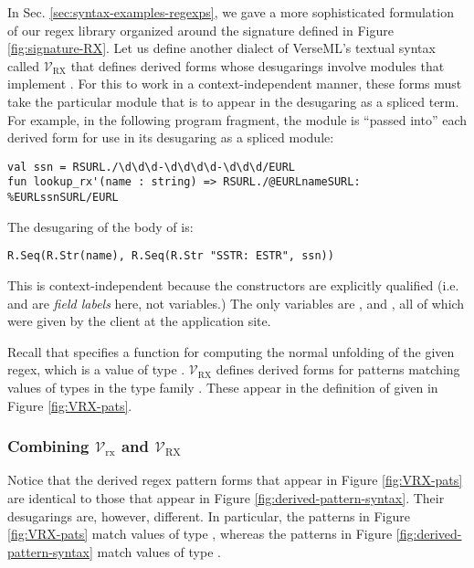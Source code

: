 {In Sec. \ref{sec:syntax-examples-regexps}, we gave a more sophisticated formulation of our regex library organized around the signature  defined in Figure \ref{fig:signature-RX}. Let us define another dialect of VerseML's textual syntax called $\mathcal{V}_\text{RX}$ that defines derived forms whose desugarings involve modules that implement . For this to work in a  context-independent manner, these forms must take the particular module that is to appear in the desugaring as a spliced term. For example, in the following program fragment, the module  is ``passed into'' each derived form for use in its desugaring as a spliced module:
\begin{lstlisting}[numbers=none]
val ssn = RSURL./\d\d\d-\d\d\d\d-\d\d\d/EURL
fun lookup_rx'(name : string) => RSURL./@EURLnameSURL: %EURLssnSURL/EURL
\end{lstlisting}
The desugaring of the body of  is:
\begin{lstlisting}[numbers=none]
R.Seq(R.Str(name), R.Seq(R.Str "SSTR: ESTR", ssn))
\end{lstlisting}
This is context-independent because the constructors are explicitly qualified (i.e.  and  are \emph{field labels} here, not variables.) The only variables are ,  and , all of which were given by the client at the application site.

Recall that  specifies a function  for computing the normal unfolding of the given regex, which is a value of type . $\mathcal{V}_\text{RX}$ defines derived forms for patterns matching values of types in the type family . These appear in the definition of  given in Figure \ref{fig:VRX-pats}.


\subsubsection{Combining $\mathcal{V}_\text{rx}$ and $\mathcal{V}_\text{RX}$}

Notice that the derived regex pattern forms that appear in Figure \ref{fig:VRX-pats} are identical to those that appear in Figure \ref{fig:derived-pattern-syntax}. Their desugarings are, however, different. In particular, the patterns in Figure \ref{fig:VRX-pats} match values of type , whereas the patterns in Figure \ref{fig:derived-pattern-syntax} match values of type . 

}
